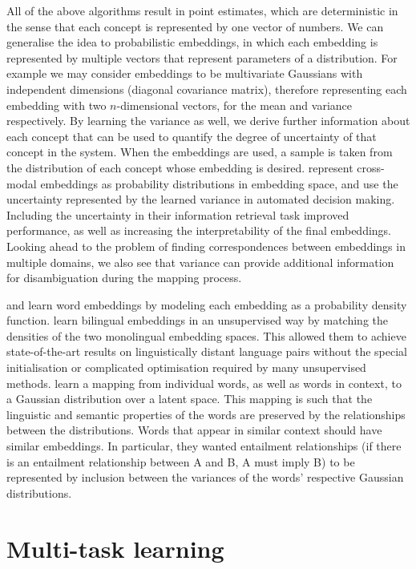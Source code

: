 All of the above algorithms result in point estimates, which are deterministic in the sense that each concept is represented by one vector of numbers. We can generalise the idea to probabilistic embeddings, in which each embedding is represented by multiple vectors that represent parameters of a distribution. For example we may consider embeddings to be multivariate Gaussians with independent dimensions (diagonal covariance matrix), therefore representing each embedding with two $n$-dimensional vectors, for the mean and variance respectively. By learning the variance as well, we derive further information about each concept that can be used to quantify the degree of uncertainty of that concept in the system. When the embeddings are used, a sample is taken from the distribution of each concept whose embedding is desired. \cite{ProbabilisticEmbeddingsCrossModal} represent cross-modal embeddings as probability distributions in embedding space, and use the uncertainty represented by the learned variance in automated decision making. Including the uncertainty in their information retrieval task improved performance, as well as increasing the interpretability of the final embeddings. Looking ahead to the problem of finding correspondences between embeddings in multiple domains, we also see that variance can provide additional information for disambiguation during the mapping process. 

\cite{DensityMatchingWordEmbeddings} and \cite{vilnis2015word} learn word embeddings by modeling each embedding as a probability density function. \cite{DensityMatchingWordEmbeddings} learn bilingual embeddings in an unsupervised way by matching the densities of the two monolingual embedding spaces. This allowed them to achieve state-of-the-art results on linguistically distant language pairs without the special initialisation or complicated optimisation required by many unsupervised methods. \cite{vilnis2015word} learn a mapping from individual words, as well as words in context, to a Gaussian distribution over a latent space. This mapping is such that the linguistic and semantic properties of the words are preserved by the relationships between the distributions. Words that appear in similar context should have similar embeddings. In particular, they wanted entailment relationships (if there is an entailment relationship between A and B, A must imply B) to be represented by inclusion between the variances of the words' respective Gaussian distributions. 

\section{Multi-task learning}

